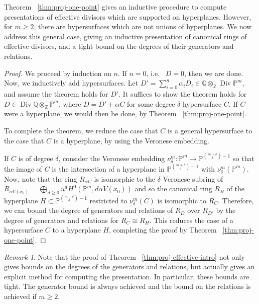 \documentclass{amsart}
\theoremstyle{plain}
\theoremstyle{definition}
\theoremstyle{remark}
\newtheorem{rem}[thm]{Remark}
\numberwithin{equation}{section}
\newcommand\bq{{\mathbb Q}}
\newcommand\bp{{\mathbb P}}
\newcommand\bz{{\mathbb Z}}
\DeclareMathOperator\di{Div}
\newcommand\pdeg{\delta}
\begin{document}
Theorem ~\ref{thm:proj-one-point} gives an inductive procedure to
compute presentations of effective divisors which are supported on
hyperplanes. However, for $m \geq 2$, there are hypersurfaces which
are not unions of hyperplanes. We now address this general case, giving an inductive presentation of canonical rings of effective divisors, and a tight bound on the degrees of their generators and
relations.

\restateeffective*


\begin{proof}
We proceed by induction on $n$.
If $n = 0$, i.e.~ $D = 0$, then we are done.
Now, we inductively add hypersurfaces.
Let $D' = \sum_{i = 0}^{n} \alpha_i D_i \in \bq \otimes_\bz \di \bp^m$, 
and assume the theorem holds for $D'$. It suffices to show
the theorem holds for $D \in \di \bq \otimes_\bz \bp^m$, where $D = D' + \alpha C$ for some
degree $\pdeg$ hypersurface $C$.
If $C$ were a hyperplane, we would then be done, by Theorem ~\ref{thm:proj-one-point}.

To complete the theorem, we reduce the case that $C$ is a general hypersurface
to the case that $C$ is a hyperplane, by using the Veronese embedding.

If $C$ is of degree $\pdeg$, consider the Veronese embedding
$\nu_\pdeg^m \colon \bp^m \rightarrow \bp^{\binom{m+\pdeg}{\pdeg}-1}$
so that the image of $C$ is the intersection of 
a hyperplane in $\bp^{\binom{{m + \pdeg}}{\pdeg} - 1}$ with $\nu_\pdeg^m(\bp^m)$.
Now, note that the ring $R_{\alpha C}$ is isomorphic to the
$\pdeg$ Veronese subring of $R_{\alpha V(x_0)} = \bigoplus_{d \geq 0} u^d H^0(\bp^m, d \alpha V(x_0))$ and so
the canonical ring $R_H$ of the hyperplane $H \subset \bp^{\binom{m+\pdeg}{\pdeg}-1}$
restricted to $\nu_\pdeg^m(C)$ is isomorphic to $R_C$.
Therefore, we can bound the degree of generators and relations of
$R_D$ over $R_{D'}$ by the degree of generators and
relations for $R_C \cong R_H.$
This reduces the case of a hypersurface $C$ to
a hyperplane $H$, completing the proof by Theorem
~\ref{thm:proj-one-point}.
\end{proof}

\begin{rem}
\label{rem:exact-effective-bounds}
Note that the proof of Theorem ~\ref{thm:proj-effective-intro} not only gives bounds on the degrees of the generators and relations, but actually gives an explicit method for computing the presentation. In particular, these bounds are tight. The generator bound is always achieved and the bound on the relations is achieved if $m \geq 2$.
\end{rem}
\end{document}
